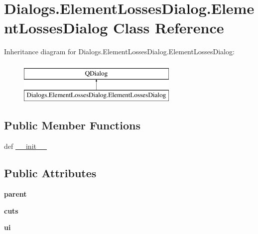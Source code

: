 \hypertarget{classDialogs_1_1ElementLossesDialog_1_1ElementLossesDialog}{\section{Dialogs.\-Element\-Losses\-Dialog.\-Element\-Losses\-Dialog Class Reference}
\label{classDialogs_1_1ElementLossesDialog_1_1ElementLossesDialog}
}
Inheritance diagram for Dialogs.\-Element\-Losses\-Dialog.\-Element\-Losses\-Dialog\-:\begin{figure}[H]
\begin{center}
\leavevmode
\includegraphics[height=2.000000cm]{classDialogs_1_1ElementLossesDialog_1_1ElementLossesDialog}
\end{center}
\end{figure}
\subsection*{Public Member Functions}
\begin{DoxyCompactItemize}
\item 
def \hyperlink{classDialogs_1_1ElementLossesDialog_1_1ElementLossesDialog_a6afdd9e38dff7e080a49eadd15e9d8c1}{\-\_\-\-\_\-init\-\_\-\-\_\-}
\end{DoxyCompactItemize}
\subsection*{Public Attributes}
\begin{DoxyCompactItemize}
\item 
\hypertarget{classDialogs_1_1ElementLossesDialog_1_1ElementLossesDialog_a6846ba3ab79e357c43602b2072490c01}{{\bfseries parent}}\label{classDialogs_1_1ElementLossesDialog_1_1ElementLossesDialog_a6846ba3ab79e357c43602b2072490c01}

\item 
\hypertarget{classDialogs_1_1ElementLossesDialog_1_1ElementLossesDialog_a5b73706c3d315d32f3db31d376814c6e}{{\bfseries cuts}}\label{classDialogs_1_1ElementLossesDialog_1_1ElementLossesDialog_a5b73706c3d315d32f3db31d376814c6e}

\item 
\hypertarget{classDialogs_1_1ElementLossesDialog_1_1ElementLossesDialog_a9a6774d19bd8b3dd1133d45f963c8a5d}{{\bfseries ui}}\label{classDialogs_1_1ElementLossesDialog_1_1ElementLossesDialog_a9a6774d19bd8b3dd1133d45f963c8a5d}

\end{DoxyCompactItemize}
